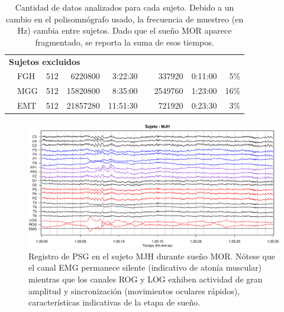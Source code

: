 \documentclass[12pt,a4paper]{mitthesis}
\begin{document}
\begin{table}
\begin{tabular}{llcrrcrrr}
\midrule

\multicolumn{6}{l}{\textbf{Sujetos excluidos}}\\
&FGH &512       &6220800 &   3:22:30 &&337920  &   0:11:00 & 5\% \\
&MGG &512       &15820800&   8:35:00 &&2549760 &   1:23:00 &16\% \\
&EMT &512       &21857280&  11:51:30 &&721920  &   0:23:30 & 3\% \\
\bottomrule
\end{tabular}
\caption{Cantidad de datos analizados para cada sujeto. Debido a un cambio en el polisomn\'ografo 
usado, la frecuencia de muestreo (en Hz) cambia entre sujetos.
Dado que el sue\~no MOR aparece fragmentado, se reporta la suma de esos tiempos.}
\label{frecuencias}
\end{table}

\begin{figure}
\centering
\includegraphics[width=\linewidth]
{./p_170427/MJH_190_PDG_lucirse_PSG.pdf}
\caption{Registro de PSG en el sujeto MJH durante sue\~no MOR. N\'otese que el canal EMG permanece 
silente (indicativo de aton\'ia muscular) mientras que los canales ROG y LOG exhiben actividad de 
gran amplitud y sincronizaci\'on (movimientos oculares r\'apidos), caracter\'isticas indicativas de
la etapa de sue\~no.}
\label{ejemplos_mor}
\end{figure}


\end{document}
